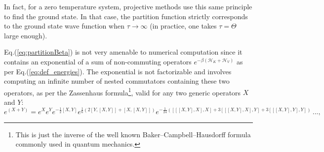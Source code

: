 %
%
In fact, for a zero temperature system, projective methods use this same principle to find the ground state.
In that case, the partition function strictly corresponds to the ground state wave function when $\tau \rightarrow \infty$ (in practice, one takes $\tau = \Theta$ large enough).
 
Eq.(\ref{eq:partitionBeta}) is not very amenable to numerical computation since it contains an exponential of a sum of non-commuting operators $e^{-\beta (\mathcal{H}_K + \mathcal{H}_V)}$ as per Eq.(\ref{eq:def_energies}). 
The exponential is not factorizable and involves computing an infinite number of nested commutators containing these two operators, as per the Zassenhaus formula\footnote{This is just the inverse of the well known Baker–Campbell–Hausdorff formula commonly used in quantum mechanics.}, valid for any two generic operators $X$ and $Y$:
\begin{equation}\label{eq:zassenhaus}
e^{(X+Y)}=e^{X} e^{Y} e^{-{\frac{1}{2}}[X,Y]} e^{{\frac {1}{6}}(2[Y,[X,Y]]+[X,[X,Y]])}  e^{{-\frac {1}{24}}([[[X,Y],X],X]+3[[[X,Y],X],Y]+3[[[X,Y],Y],Y])} \, ... , 
\end{equation}

